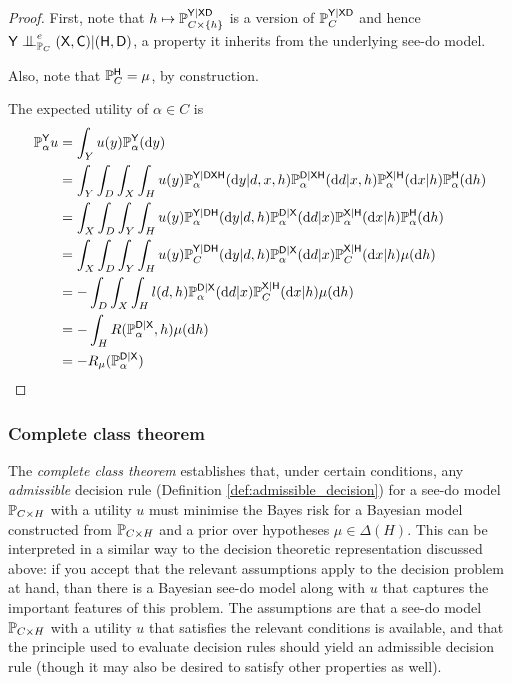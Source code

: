 \begin{proof}
First, note that $h\mapsto \mathbb{P}_{C\times \{h\}}^{\mathsf{Y}|\mathsf{XD}}$ is a version of $\mathbb{P}_C^{\mathsf{Y}|\mathsf{XD}}$ and hence $\RV{Y}\CI^e_{\prob{P}_C} (\RV{X},\RV{C})|(\RV{H},\RV{D})$, a property it inherits from the underlying see-do model.

Also, note that $\mathbb{P}_C^{\mathsf{H}}=\mu$, by construction.

The expected utility of $\alpha\in C$ is 
\begin{align}
    \mathbb{P}_\alpha^{\mathsf{Y}} u &= \int_Y u(y) \mathbb{P}_{\alpha}^{\mathsf{Y}}(\mathrm{d}y) \\
    &= \int_Y  \int_D \int_{X} \int_H u(y)\mathbb{P}_{\alpha}^{\mathsf{Y}|\mathsf{DXH}}(\mathrm{d}y|d,x,h)\mathbb{P}_{\alpha}^{\mathsf{D}|\mathsf{XH}}(\mathrm{d}d|x,h)\mathbb{P}_{\alpha}^{\mathsf{X}|\mathsf{H}}(\mathrm{d}x|h)\mathbb{P}_\alpha^{\mathsf{H}}(\mathrm{d}h) \\
    &= \int_X  \int_D \int_{Y} \int_H u(y) \mathbb{P}_{\alpha}^{\mathsf{Y}|\mathsf{DH}}(\mathrm{d}y|d,h)\mathbb{P}_{\alpha}^{\mathsf{D}|\mathsf{X}}(\mathrm{d}d|x)\mathbb{P}_{\alpha}^{\mathsf{X}|\mathsf{H}}(\mathrm{d}x|h)\mathbb{P}_\alpha^{\mathsf{H}}(\mathrm{d}h)\\
    &=  \int_X  \int_D \int_{Y} \int_H u(y) \mathbb{P}_{C}^{\mathsf{Y}|\mathsf{DH}}(\mathrm{d}y|d,h)\mathbb{P}_{\alpha}^{\mathsf{D}|\mathsf{X}}(\mathrm{d}d|x)\mathbb{P}_{C}^{\mathsf{X}|\mathsf{H}}(\mathrm{d}x|h)\mu(\mathrm{d}h)\\
     &= -\int_D\int_X\int_H l(d,h)\mathbb{P}_{\alpha}^{\mathsf{D}|\mathsf{X}}(\mathrm{d}d|x)\mathbb{P}_{C}^{\mathsf{X}|\mathsf{H}}(\mathrm{d}x|h)\mu(\mathrm{d}h)\\
    &= -\int_H R(\mathbb{P}_{\alpha}^{\mathsf{D}|\mathsf{X}},h)\mu(\mathrm{d}h)\\
    &= -R_{\mu}(\mathbb{P}_{\alpha}^{\mathsf{D}|\mathsf{X}})
\end{align}
\end{proof}

\subsubsection{Complete class theorem}\label{sec:cc_theorem}

The \emph{complete class theorem} establishes that, under certain conditions, any \emph{admissible} decision rule (Definition \ref{def:admissible_decision}) for a see-do model $\mathbb{P}_{C\times H}$ with a utility $u$ must minimise the Bayes risk for a Bayesian model constructed from $\mathbb{P}_{C\times H}$ and a prior over hypotheses $\mu\in \Delta(H)$. This can be interpreted in a similar way to the decision theoretic representation discussed above: if you accept that the relevant assumptions apply to the decision problem at hand, than there is a Bayesian see-do model along with $u$ that captures the important features of this problem. The assumptions are that a see-do model $\mathbb{P}_{C\times H}$ with a utility $u$ that satisfies the relevant conditions is available, and that the principle used to evaluate decision rules should yield an admissible decision rule (though it may also be desired to satisfy other properties as well).

